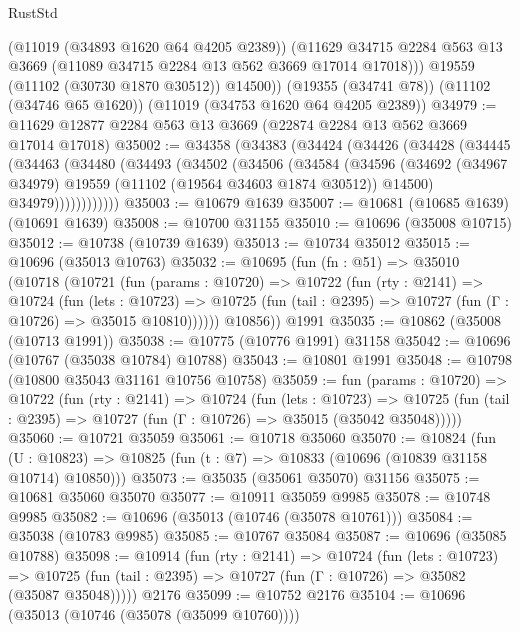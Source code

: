 \begin{lexlean}{RustStd}
\begin{coremodule}
          (@11019 (@34893 @1620 @64 @4205 @2389))
          (@11629 @34715 @2284 @563 @13 @3669 (@11089 @34715 @2284 @13 @562 @3669 @17014 @17018)))
        @19559
        (@11102 (@30730 @1870 @30512))
        @14500))
    (@19355 (@34741 @78))
    (@11102 (@34746 @65 @1620))
    (@11019 (@34753 @1620 @64 @4205 @2389))
@34979 := @11629 @12877 @2284 @563 @13 @3669 (@22874 @2284 @13 @562 @3669 @17014 @17018)
@35002 := @34358
    (@34383
      (@34424
        (@34426
          (@34428
            (@34445
              (@34463
                (@34480
                  (@34493
                    (@34502
                      (@34506
                        (@34584
                          (@34596
                            (@34692
                              (@34967 @34979)
                              @19559
                              (@11102 (@19564 @34603 @1874 @30512))
                              @14500)
                            @34979))))))))))))
@35003 := @10679 @1639
@35007 := @10681 (@10685 @1639) (@10691 @1639)
@35008 := @10700 @31155
@35010 := @10696 (@35008 @10715)
@35012 := @10738 (@10739 @1639)
@35013 := @10734 @35012
@35015 := @10696 (@35013 @10763)
@35032 := @10695
    (fun (fn : @51) =>
    @35010
      (@10718
        (@10721
          (fun (params : @10720) =>
          @10722
            (fun (rty : @2141) =>
            @10724
              (fun (lets : @10723) =>
              @10725 (fun (tail : @2395) => @10727 (fun (Γ : @10726) => @35015 @10810))))))
        @10856))
    @1991
@35035 := @10862 (@35008 (@10713 @1991))
@35038 := @10775 (@10776 @1991) @31158
@35042 := @10696 (@10767 (@35038 @10784) @10788)
@35043 := @10801 @1991
@35048 := @10798 (@10800 @35043 @31161 @10756 @10758)
@35059 := fun (params : @10720) =>
  @10722
    (fun (rty : @2141) =>
    @10724
      (fun (lets : @10723) =>
      @10725 (fun (tail : @2395) => @10727 (fun (Γ : @10726) => @35015 (@35042 @35048)))))
@35060 := @10721 @35059
@35061 := @10718 @35060
@35070 := @10824
    (fun (U : @10823) => @10825 (fun (t : @7) => @10833 (@10696 (@10839 @31158 @10714) @10850)))
@35073 := @35035 (@35061 @35070) @31156
@35075 := @10681 @35060 @35070
@35077 := @10911 @35059 @9985
@35078 := @10748 @9985
@35082 := @10696 (@35013 (@10746 (@35078 @10761)))
@35084 := @35038 (@10783 @9985)
@35085 := @10767 @35084
@35087 := @10696 (@35085 @10788)
@35098 := @10914
    (fun (rty : @2141) =>
    @10724
      (fun (lets : @10723) =>
      @10725 (fun (tail : @2395) => @10727 (fun (Γ : @10726) => @35082 (@35087 @35048)))))
    @2176
@35099 := @10752 @2176
@35104 := @10696 (@35013 (@10746 (@35078 (@35099 @10760))))

\end{coremodule}
\end{lexlean}
